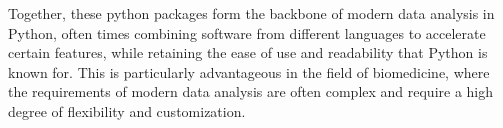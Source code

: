 Together, these python packages form the backbone of modern data analysis in Python,
often times combining software from different languages to accelerate certain
features, while retaining the ease of use and readability that Python is known
for. This is particularly advantageous in the field of biomedicine, where the
requirements of modern data analysis are often complex and require a high degree
of flexibility and customization.
